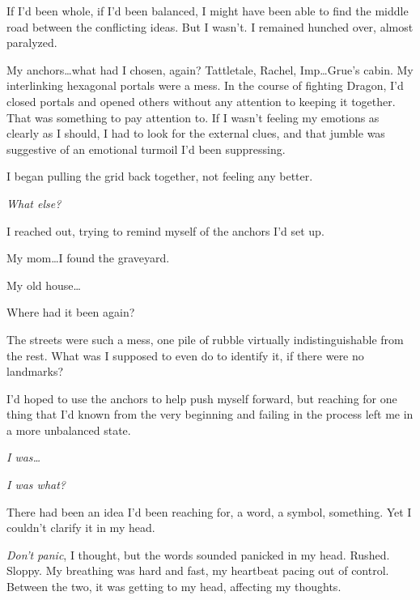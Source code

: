 If I'd been whole, if I'd been balanced, I might have been able to find the middle road between the conflicting ideas.  But I wasn't.  I remained hunched over, almost paralyzed.



My anchors\ldots what had I chosen, again?  Tattletale, Rachel, Imp\ldots Grue's cabin.  My interlinking hexagonal portals were a mess.  In the course of fighting Dragon, I'd closed portals and opened others without any attention to keeping it together. That was something to pay attention to.  If I wasn't feeling my emotions as clearly as I should, I had to look for the external clues, and that jumble was suggestive of an emotional turmoil I'd been suppressing.



I began pulling the grid back together, not feeling any better.



\emph{What else?}



I reached out, trying to remind myself of the anchors I'd set up.



My mom\ldots I found the graveyard.



My old house\ldots



Where had it been again?



The streets were such a mess, one pile of rubble virtually indistinguishable from the rest.  What was I supposed to even do to identify it, if there were no landmarks?



I'd hoped to use the anchors to help push myself forward, but reaching for one thing that I'd known from the very beginning and failing in the process left me in a more unbalanced state.



\emph{I was\ldots}



\emph{I was what?}



There had been an idea I'd been reaching for, a word, a symbol, something.  Yet I couldn't clarify it in my head.



\emph{Don't panic}, I thought, but the words sounded panicked in my head.  Rushed.  Sloppy.  My breathing was hard and fast, my heartbeat pacing out of control.  Between the two, it was getting to my head, affecting my thoughts.



